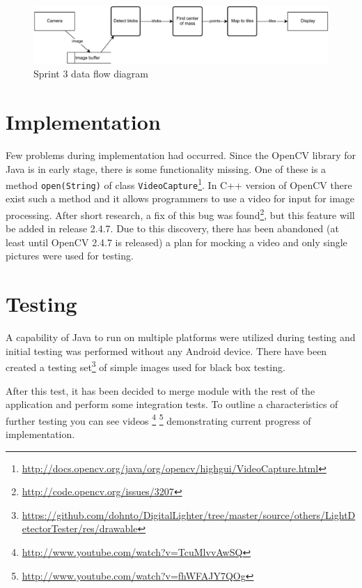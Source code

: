 \begin{figure}[h]
	\centering
		\includegraphics[width=16.2cm]{sprint3/sprint3_dtd.pdf}
	\caption{Sprint 3 data flow diagram}
	\label{fig:sprint3_dfd}
\end{figure}


\section{Implementation}
\label{sec:sprint3_implementation}
Few problems during implementation had occurred. 
Since the OpenCV library for Java is in early stage, there is some functionality missing.
One of these is a method \texttt{open(String)} of class \texttt{VideoCapture}\footnote{\url{http://docs.opencv.org/java/org/opencv/highgui/VideoCapture.html}}.
In C++ version of OpenCV there exist such a method and it allows programmers to use a video for input for image processing.
After short research, a fix of this bug was found\footnote{\url{http://code.opencv.org/issues/3207}}, but this feature will be added in release 2.4.7.
Due to this discovery, there has been abandoned (at least until OpenCV 2.4.7 is released) a plan for mocking a video and only single pictures were used for testing.

\section{Testing}
A capability of Java to run on multiple platforms were utilized during testing and initial testing was performed without any Android device.
There have been created a testing set\footnote{\url{https://github.com/dohnto/DigitalLighter/tree/master/source/others/LightDetectorTester/res/drawable}} of simple images used for black box testing.

After this test, it has been decided to merge module with the rest of the application and perform some integration tests.
To outline a characteristics of further testing you can see videos \footnote{\url{http://www.youtube.com/watch?v=TcuMlvvAwSQ}} \footnote{\url{http://www.youtube.com/watch?v=fhWFAJY7QOg}} demonstrating current progress of implementation.

